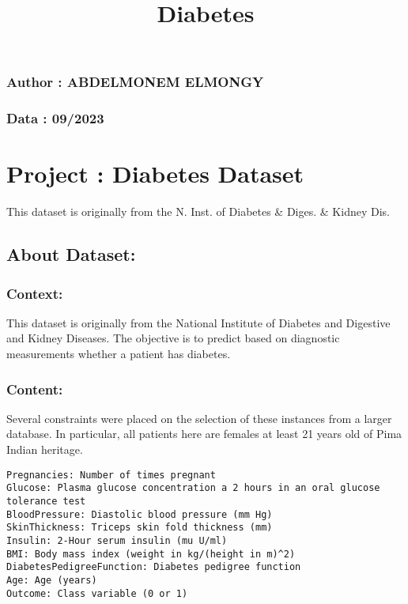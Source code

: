 \documentclass[11pt]{article}
\title{Diabetes}
\begin{document}
    
    \maketitle
    
    

    
    \hypertarget{author-abdelmonem-elmongy}{%
\subsubsection{Author : ABDELMONEM
ELMONGY}\label{author-abdelmonem-elmongy}}

\hypertarget{data-092023}{%
\subsubsection{Data : 09/2023}\label{data-092023}}

    \hypertarget{project-diabetes-dataset}{%
\section{Project : Diabetes Dataset}\label{project-diabetes-dataset}}

This dataset is originally from the N. Inst. of Diabetes \& Diges. \&
Kidney Dis.

    \hypertarget{about-dataset}{%
\subsection{About Dataset:}\label{about-dataset}}

\hypertarget{context}{%
\subsubsection{Context:}\label{context}}

This dataset is originally from the National Institute of Diabetes and
Digestive and Kidney Diseases. The objective is to predict based on
diagnostic measurements whether a patient has diabetes.

\hypertarget{content}{%
\subsubsection{Content:}\label{content}}

Several constraints were placed on the selection of these instances from
a larger database. In particular, all patients here are females at least
21 years old of Pima Indian heritage.

\begin{verbatim}
Pregnancies: Number of times pregnant
Glucose: Plasma glucose concentration a 2 hours in an oral glucose tolerance test
BloodPressure: Diastolic blood pressure (mm Hg)
SkinThickness: Triceps skin fold thickness (mm)
Insulin: 2-Hour serum insulin (mu U/ml)
BMI: Body mass index (weight in kg/(height in m)^2)
DiabetesPedigreeFunction: Diabetes pedigree function
Age: Age (years)
Outcome: Class variable (0 or 1)
\end{verbatim}
\end{document}
